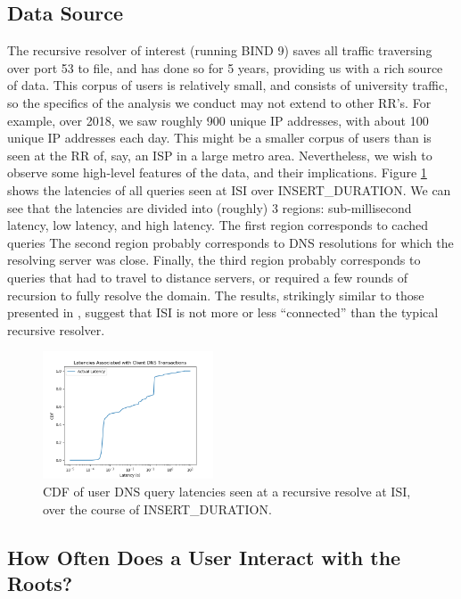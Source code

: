 \documentclass[sigconf,nonacm,10pt]{acmart}
\begin{document}
\subsection{Data Source}\label{data-source}

\label{sec:rr_close_look_data} The recursive resolver of interest
(running BIND 9) saves all traffic traversing over port 53 to file, and
has done so for 5 years, providing us with a rich source of data. This
corpus of users is relatively small, and consists of university traffic,
so the specifics of the analysis we conduct may not extend to other
RR's. For example, over 2018, we saw roughly 900 unique IP addresses,
with about 100 unique IP addresses each day. This might be a smaller
corpus of users than is seen at the RR of, say, an ISP in a large metro
area. Nevertheless, we wish to observe some high-level features of the
data, and their implications. \break
Figure \ref{fig:all_dns_latencies_isi} shows the latencies of all
queries seen at ISI over INSERT\_DURATION. We can see that the latencies
are divided into (roughly) 3 regions: sub-millisecond latency, low
latency, and high latency. The first region corresponds to cached
queries The second region probably corresponds to DNS resolutions for
which the resolving server was close. Finally, the third region probably
corresponds to queries that had to travel to distance servers, or
required a few rounds of recursion to fully resolve the domain. The
results, strikingly similar to those presented in
\cite{callahan2013modern}, suggest that ISI is not more or less
``connected'' than the typical recursive resolver.

\begin{figure}
    \centering
    \includegraphics[width=0.45\textwidth]{figures/all_dns_latencies_isi.png}
    \caption{CDF of user DNS query latencies seen at a recursive resolve at ISI, over the course of INSERT\_DURATION. }
    \label{fig:all_dns_latencies_isi}
\end{figure}

\subsection{How Often Does a User Interact with the
Roots?}\label{how-often-does-a-user-interact-with-the-roots}
\end{document}
